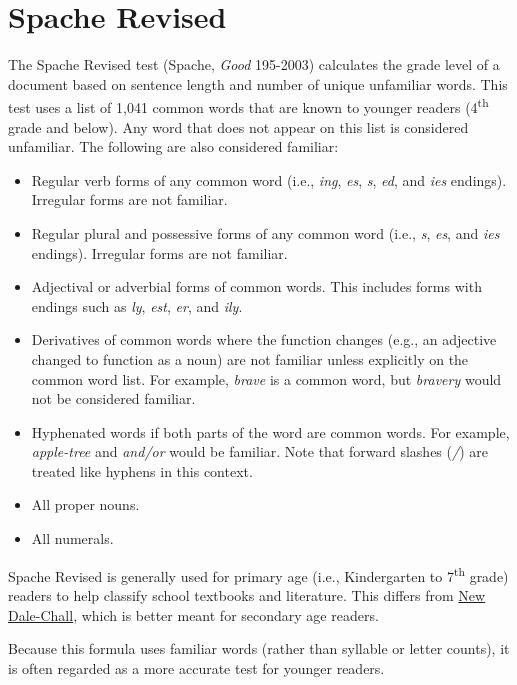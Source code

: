 \documentclass[
]{book}
\providecommand{\tightlist}{%
  \setlength{\itemsep}{0pt}\setlength{\parskip}{0pt}}
\theoremstyle{definition}
\theoremstyle{definition}
\theoremstyle{definition}
\theoremstyle{definition}
\theoremstyle{remark}
\begin{document}
\hypertarget{spache-test}{%
\section{\texorpdfstring{Spache Revised}{Spache Revised}}\label{spache-test}}

The Spache Revised test (Spache, \emph{Good} 195-2003) calculates the grade level of a document based on sentence length and number of unique unfamiliar words. This test uses a list of 1,041 common words that are known to younger readers (4\textsuperscript{th} grade and below). Any word that does not appear on this list is considered unfamiliar. The following are also considered familiar:

\begin{itemize}
\tightlist
\item
  Regular verb forms of any common word (i.e., \emph{ing}, \emph{es}, \emph{s}, \emph{ed}, and \emph{ies} endings). Irregular forms are not familiar.
\item
  Regular plural and possessive forms of any common word (i.e., \emph{s}, \emph{es}, and \emph{ies} endings). Irregular forms are not familiar.
\item
  Adjectival or adverbial forms of common words. This includes forms with endings such as \emph{ly}, \emph{est}, \emph{er}, and \emph{ily}.
\item
  Derivatives of common words where the function changes (e.g., an adjective changed to function as a noun) are not familiar unless explicitly on the common word list. For example, \emph{brave} is a common word, but \emph{bravery} would not be considered familiar.
\item
  Hyphenated words if both parts of the word are common words. For example, \emph{apple-tree} and \emph{and/or} would be familiar. Note that forward slashes (\emph{/}) are treated like hyphens in this context.
\item
  All proper nouns.
\item
  All numerals.
\end{itemize}

Spache Revised is generally used for primary age (i.e., Kindergarten to 7\textsuperscript{th} grade) readers to help classify school textbooks and literature. This differs from \protect\hyperlink{dale-chall-test}{New Dale-Chall}, which is better meant for secondary age readers.

Because this formula uses familiar words (rather than syllable or letter counts), it is often regarded as a more accurate test for younger readers.
\end{document}
